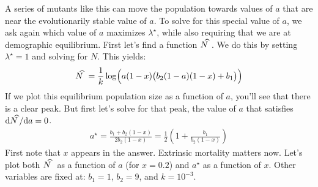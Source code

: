 \documentclass[10pt,reqno]{amsbook}
\newcommand*{\xwidehat}[2]{#2\kern#1\widehat{\phantom{#2}}}
\numberwithin{equation}{chapter}
\newcommand{\mr}{\mathrm}
\begin{document}
A series of mutants like this can move the population towards values of $a$ that are near the evolutionarily stable value of $a$. To solve for this special value of $a$, we ask again which value of $a$ maximizes $\lambda^{\!\star}$, while also requiring that we are at demographic equilibrium. First let's find a function $\xwidehat{-0.57em}{N}$. We do this by setting $\lambda^{\!\star} = 1$ and solving for $N$. This yields:
\begin{align*}
	\xwidehat{-0.57em}{N} = \frac{1}{k} \log \! \Big( a (1-x) \big( b_2 (1-a) (1-x) + {b_1} \big) \Big)
\end{align*}
If we plot this equilibrium population size as a function of $a$, you'll see that there is a clear peak. But first let's solve for that peak, the value of $a$ that satisfies $\mr d \xwidehat{-0.57em}{N} \! / \mr d a = 0$.
\begin{align*}
	a^{\star} = \frac{b_1 + b_2(1-x)}{2 b_2 (1-x) } = 
				\frac{1}{2} \left( 1 + \frac{b_1}{b_2(1-x)} \right)
\end{align*}
First note that $x$ appears in the answer. Extrinsic mortality matters now. Let's plot both $\xwidehat{-0.57em}{N}$ as a function of $a$ (for $x=0.2$) and $a^{\!\star}$ as a function of $x$. Other variables are fixed at: $b_1=1$, $b_2=9$, and $k=10^{-3}$.
\end{document}
